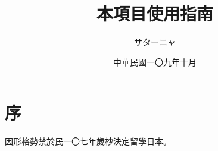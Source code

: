 \documentclass[11pt]{ltjtreport}
\title{本項目使用指南}
\author{サターニャ}
\date{中華民國一〇九年十月}
\begin{document}
\maketitle
\chapter*{序}
因形格勢禁於民一〇七年歲杪決定留學日本。
\end{document}
